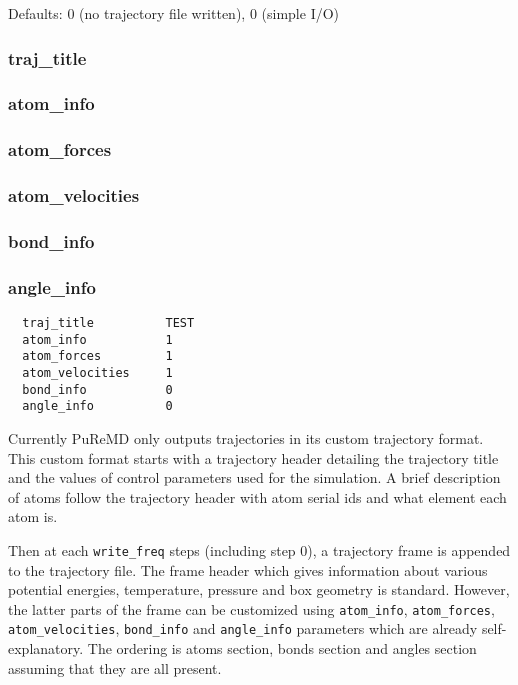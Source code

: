 \documentclass{article}
\begin{document}
Defaults: 0 (no trajectory file written), 0 (simple I/O)


\subsubsection{traj\_title}
\label{sec:traj_title}
\subsubsection{atom\_info}
\label{sec:atom_info}
\subsubsection{atom\_forces}
\label{sec:atom_forces}
\subsubsection{atom\_velocities}
\label{sec:atom_velocities}
\subsubsection{bond\_info}
\label{sec:bond_info}
\subsubsection{angle\_info}
\label{sec:angle_info}

\begin{verbatim}
  traj_title          TEST
  atom_info           1
  atom_forces         1
  atom_velocities     1
  bond_info           0
  angle_info          0
\end{verbatim}
Currently PuReMD only outputs trajectories in its custom trajectory 
format. This custom format starts with a trajectory header detailing 
the trajectory title and the values of control parameters used for 
the simulation. A brief description of atoms follow the trajectory 
header with atom serial ids and what element each atom is.

Then at each {\tt write\_freq} steps (including step 0), a trajectory 
frame is appended to the trajectory file.  The frame header which gives 
information about various potential energies, temperature, pressure and 
box geometry is standard. However, the latter parts of the frame can be 
customized using {\tt atom\_info}, {\tt atom\_forces}, {\tt atom\_velocities}, 
{\tt bond\_info} and {\tt angle\_info} parameters which are already
self-explanatory. The ordering is atoms section, bonds section and angles 
section assuming that they are all present.
\end{document}
